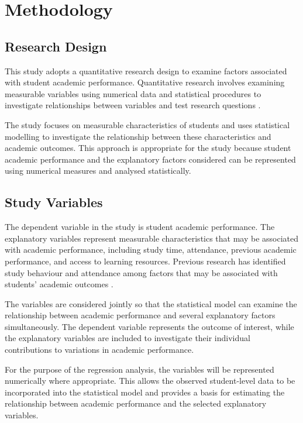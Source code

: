 \section{Methodology}

\subsection{Research Design}

This study adopts a quantitative research design to examine factors associated with student academic performance. Quantitative research involves examining measurable variables using numerical data and statistical procedures to investigate relationships between variables and test research questions \citep{creswell2023research}.

The study focuses on measurable characteristics of students and uses statistical modelling to investigate the relationship between these characteristics and academic outcomes. This approach is appropriate for the study because student academic performance and the explanatory factors considered can be represented using numerical measures and analysed statistically.

\subsection{Study Variables}

The dependent variable in the study is student academic performance. The explanatory variables represent measurable characteristics that may be associated with academic performance, including study time, attendance, previous academic performance, and access to learning resources. Previous research has identified study behaviour and attendance among factors that may be associated with students' academic outcomes \citep{masnan2025academic,ha2024attendance}.

The variables are considered jointly so that the statistical model can examine the relationship between academic performance and several explanatory factors simultaneously. The dependent variable represents the outcome of interest, while the explanatory variables are included to investigate their individual contributions to variations in academic performance.

For the purpose of the regression analysis, the variables will be represented numerically where appropriate. This allows the observed student-level data to be incorporated into the statistical model and provides a basis for estimating the relationship between academic performance and the selected explanatory variables.

